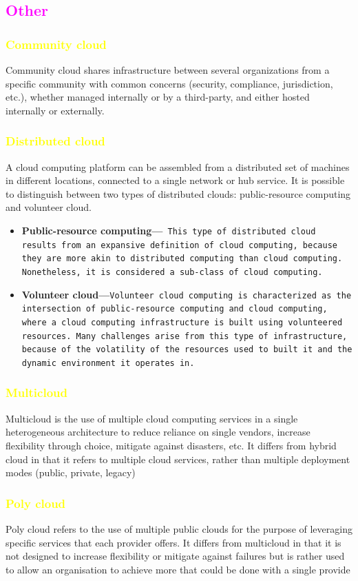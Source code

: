 \documentclass[11pt]{article}
\begin{document}
\subsection{\textcolor{magenta}{Other}}
\subsubsection{\textcolor{yellow}{Community cloud}}
Community cloud shares infrastructure between several organizations from a specific community with common concerns (security, compliance, jurisdiction, etc.), whether managed internally or by a third-party, and either hosted internally or externally. 
\subsubsection{\textcolor{yellow}{Distributed  cloud}}
A cloud computing platform can be assembled from a distributed set of machines in different locations, connected to a single network or hub service. It is possible to distinguish between two types of distributed clouds: public-resource computing and volunteer cloud.
\begin{itemize}
\item \textbf{Public-resource computing—}\texttt{
This type of distributed cloud results from an expansive definition of cloud computing, because they are more akin to distributed computing than cloud computing. Nonetheless, it is considered a sub-class of cloud computing.}
\item \textbf{Volunteer cloud—}\texttt{Volunteer cloud computing is characterized as the intersection of public-resource computing and cloud computing, where a cloud computing infrastructure is built using volunteered resources. Many challenges arise from this type of infrastructure, because of the volatility of the resources used to built it and the dynamic environment it operates in.}

\end{itemize}
\subsubsection{\textcolor{yellow}{Multicloud}}
Multicloud is the use of multiple cloud computing services in a single heterogeneous architecture to reduce reliance on single vendors, increase flexibility through choice, mitigate against disasters, etc. It differs from hybrid cloud in that it refers to multiple cloud services, rather than multiple deployment modes (public, private, legacy)
\subsubsection{\textcolor{yellow}{Poly cloud}}
Poly cloud refers to the use of multiple public clouds for the purpose of leveraging specific services that each provider offers. It differs from multicloud in that it is not designed to increase flexibility or mitigate against failures but is rather used to allow an organisation to achieve more that could be done with a single provide
\end{document}
